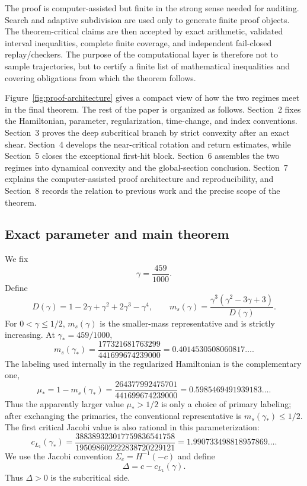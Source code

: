 \documentclass[11pt]{article}
\begin{document}
The proof is computer-assisted but finite in the strong sense needed for auditing. Search and adaptive subdivision are used only to generate finite proof objects. The theorem-critical claims are then accepted by exact arithmetic, validated interval inequalities, complete finite coverage, and independent fail-closed replay/checkers. The purpose of the computational layer is therefore not to sample trajectories, but to certify a finite list of mathematical inequalities and covering obligations from which the theorem follows.

Figure~\ref{fig:proof-architecture} gives a compact view of how the two regimes meet in the final theorem. The rest of the paper is organized as follows. Section~2 fixes the Hamiltonian, parameter, regularization, time-change, and index conventions. Section~3 proves the deep subcritical branch by strict convexity after an exact shear. Section~4 develops the near-critical rotation and return estimates, while Section~5 closes the exceptional first-hit block. Section~6 assembles the two regimes into dynamical convexity and the global-section conclusion. Section~7 explains the computer-assisted proof architecture and reproducibility, and Section~8 records the relation to previous work and the precise scope of the theorem.

\subsection{Exact parameter and main theorem}
We fix
\[
\gamma=\frac{459}{1000}.
\]
Define
\[
D(\gamma)=1-2\gamma+\gamma^2+2\gamma^3-\gamma^4,
\qquad
m_s(\gamma)=\frac{\gamma^3(\gamma^2-3\gamma+3)}{D(\gamma)}.
\]
For $0<\gamma\le 1/2$, $m_s(\gamma)$ is the smaller-mass representative and is strictly increasing. At $\gamma_*=459/1000$,
\[
m_s(\gamma_*)=
\frac{177321681763299}{441699674239000}
=0.4014530508060817\ldots .
\]
The labeling used internally in the regularized Hamiltonian is the complementary one,
\[
\mu_* = 1-m_s(\gamma_*)
=\frac{264377992475701}{441699674239000}
=0.5985469491939183\ldots .
\]
Thus the apparently larger value $\mu_*>1/2$ is only a choice of primary labeling; after exchanging the primaries, the conventional representative is $m_s(\gamma_*)\le1/2$. The first critical Jacobi value is also rational in this parameterization:
\[
c_{L_1}(\gamma_*)=
\frac{388389323017759836541758}{195098602222838720229121}
=1.990733498818957869\ldots .
\]
We use the Jacobi convention $\Sigma_c=H^{-1}(-c)$ and define
\[
\Delta = c-c_{L_1}(\gamma).
\]
Thus $\Delta>0$ is the subcritical side.
\end{document}
